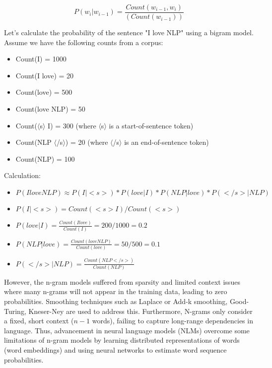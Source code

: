 $$P(w_i | w_{i-1})=\frac{Count(w_{i-1},w_i )}{(Count(w_{i-1}) )}$$

Let's calculate the probability of the sentence "I love NLP" using a bigram model. Assume we have the following counts from a corpus:
\begin{itemize}
    \item Count(I) = 1000
    \item Count(I love) = 20
    \item Count(love) = 500
    \item Count(love NLP) = 50
    \item Count($\langle$s$\rangle$ I) = 300 (where $\langle$s$\rangle$ is a start-of-sentence token)
    \item Count(NLP $\langle$/s$\rangle$) = 20 (where $\langle$/s$\rangle$ is an end-of-sentence token)
    \item Count(NLP) = 100
\end{itemize}

Calculation:

\begin{itemize}
    \item $P(I love NLP) \approx P(I|<s>) * P(love|I) * P(NLP|love) * P(</s>|NLP)$
	\item $P(I|<s>) = Count(<s> I) / Count(<s>)$
	\item $P(love|I) = \frac{Count(I love)}{Count(I)} = 200 / 1000 = 0.2$
	\item $P(NLP|love) = \frac{Count(love NLP)}{Count(love)} = 50 / 500 = 0.1$
	\item $P(</s>|NLP) = \frac{Count(NLP </s>)}{Count(NLP)}$
\end{itemize}


However, the n-gram models suffered from sparsity and limited context issues where many n-grams will not appear in the training data, leading to zero probabilities. Smoothing techniques such as Laplace or Add-k smoothing, Good-Turing, Kneser-Ney are used to address this. Furthermore, N-grams only consider a fixed, short context ($n-1$ words), failing to capture long-range dependencies in language. Thus, advancement in neural language models (NLMs) overcome some limitations of n-gram models by learning distributed representations of words (word embeddings) and using neural networks to estimate word sequence probabilities.

